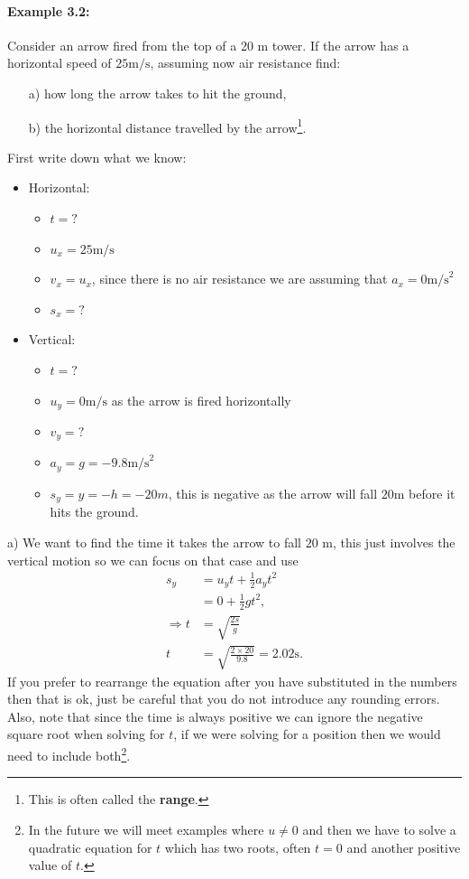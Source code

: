\documentclass[a4paper,12pt]{book}
\begin{document}
\paragraph{Example 3.2:} Consider an arrow fired from the top of a 20 m tower. If the arrow has a horizontal speed of $25 \text{m/s}$, assuming now air resistance find:
\begin{itemize}
\setlength{\itemsep}{-5pt}
    \item[a)] how long the arrow takes to hit the ground,
    \item[b)] the horizontal distance travelled by the arrow\footnote{This is often called the \textbf{range}.}.
\end{itemize}


First write down what we know:

\begin{itemize}
\setlength{\itemsep}{-5pt}
    \item Horizontal:
\begin{itemize}
\setlength{\itemsep}{-5pt}
    \item $t=?$
\item $u_{x}=25\text{m/s}$
\item $v_{x}=u_{x}$, since there is no air resistance we are assuming that $a_{x}=0\text{m/s}^{2}$
\item $s_{x}=?$
\end{itemize}
    \item Vertical:
\begin{itemize}
\setlength{\itemsep}{-5pt}
    \item $t=?$
\item $u_{y}=0\text{m/s}$ as the arrow is fired horizontally
\item $v_{y}=?$
\item $a_{y}=g=-9.8\text{m/s}^{2}$
\item $s_{y}=y=-h=-20m$, this is negative as the arrow will fall $20$m before it hits the ground. 
\end{itemize}
\end{itemize}
a) We want to find the time it takes the arrow to fall $20$ m, this just involves the vertical motion so we can focus on that case and use 
\begin{align*}
s_{y}&=u_{y}t+\frac{1}{2}a_{y}t^{2}\\
&=0+\frac{1}{2}gt^{2},\\
\Rightarrow t&=\sqrt{\frac{2s}{g}}\\
t&=\sqrt{\frac{2\times 20}{9.8}}=2.02 \text{s}.
\end{align*}
If you prefer to rearrange the equation after you have substituted in the numbers then that is ok, just be careful that you do not introduce any rounding errors. Also, note that since the time is always positive we can ignore the negative square root when solving for $t$, if we were solving for a position then we would need to include both\footnote{In the future we will meet examples where $u\neq 0$ and then we have to solve a quadratic equation for $t$ which has two roots, often $t=0$ and another positive value of $t$. }.\\
\end{document}
